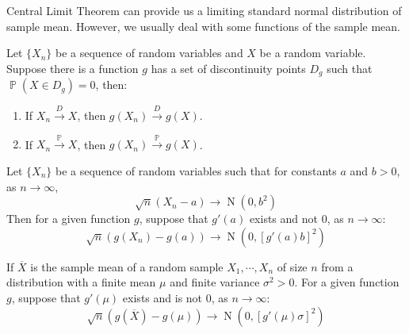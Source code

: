 \documentclass{huhtakm-template-book-v2}
\DeclareMathOperator{\prob}{\mathbb{P}}
\DeclareMathOperator{\N}{N}
\begin{document}
Central Limit Theorem can provide us a limiting standard normal distribution of sample mean. However, we usually deal with some functions of the sample mean.
\begin{thm}
	Let $\{X_{n}\}$ be a sequence of random variables and $X$ be a random variable. Suppose there is a function $g$ has a set of discontinuity points $D_{g}$ such that $\prob(X\in D_{g})=0$, then:
	\begin{enumerate}
		\item If $X_{n}\xrightarrow{D}X$, then $g(X_{n})\xrightarrow{D}g(X)$.
		\item If $X_{n}\xrightarrow{\prob}X$, then $g(X_{n})\xrightarrow{\prob}g(X)$.
	\end{enumerate}
\end{thm}
\begin{thm}
	Let $\{X_{n}\}$ be a sequence of random variables such that for constants $a$ and $b>0$, as $n\to\infty$,
	\begin{equation*}
		\sqrt{n}(X_{n}-a)\to\N(0,b^{2})
	\end{equation*}
	Then for a given function $g$, suppose that $g'(a)$ exists and not $0$, as $n\to\infty$:
	\begin{equation*}
		\sqrt{n}(g(X_{n})-g(a))\to\N(0,[g'(a)b]^{2})
	\end{equation*}
\end{thm}
\begin{cor}
	\label{Chapter 1 (Corollary) CLT for functions of random variables}
	If $\overline{X}$ is the sample mean of a random sample $X_{1},\cdots,X_{n}$ of size $n$ from a distribution with a finite mean $\mu$ and finite variance $\sigma^{2}>0$. For a given function $g$, suppose that $g'(\mu)$ exists and is not $0$, as $n\to\infty$:
	\begin{equation*}
		\sqrt{n}(g(\overline{X})-g(\mu))\to\N(0,[g'(\mu)\sigma]^{2})
	\end{equation*}  
\end{cor}
\end{document}
